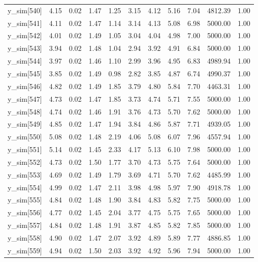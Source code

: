 \begin{table}[ht]
\begin{tabular}{rrrrrrrrrrr}
  y\_sim[540] & 4.15 & 0.02 & 1.47 & 1.25 & 3.15 & 4.12 & 5.16 & 7.04 & 4812.39 & 1.00 \\ 
  y\_sim[541] & 4.11 & 0.02 & 1.47 & 1.14 & 3.14 & 4.13 & 5.08 & 6.98 & 5000.00 & 1.00 \\ 
  y\_sim[542] & 4.01 & 0.02 & 1.49 & 1.05 & 3.04 & 4.04 & 4.98 & 7.00 & 5000.00 & 1.00 \\ 
  y\_sim[543] & 3.94 & 0.02 & 1.48 & 1.04 & 2.94 & 3.92 & 4.91 & 6.84 & 5000.00 & 1.00 \\ 
  y\_sim[544] & 3.97 & 0.02 & 1.46 & 1.10 & 2.99 & 3.96 & 4.95 & 6.83 & 4989.94 & 1.00 \\ 
  y\_sim[545] & 3.85 & 0.02 & 1.49 & 0.98 & 2.82 & 3.85 & 4.87 & 6.74 & 4990.37 & 1.00 \\ 
  y\_sim[546] & 4.82 & 0.02 & 1.49 & 1.85 & 3.79 & 4.80 & 5.84 & 7.70 & 4463.31 & 1.00 \\ 
  y\_sim[547] & 4.73 & 0.02 & 1.47 & 1.85 & 3.73 & 4.74 & 5.71 & 7.55 & 5000.00 & 1.00 \\ 
  y\_sim[548] & 4.74 & 0.02 & 1.46 & 1.91 & 3.76 & 4.73 & 5.70 & 7.62 & 5000.00 & 1.00 \\ 
  y\_sim[549] & 4.85 & 0.02 & 1.47 & 1.94 & 3.84 & 4.86 & 5.87 & 7.71 & 4939.05 & 1.00 \\ 
  y\_sim[550] & 5.08 & 0.02 & 1.48 & 2.19 & 4.06 & 5.08 & 6.07 & 7.96 & 4557.94 & 1.00 \\ 
  y\_sim[551] & 5.14 & 0.02 & 1.45 & 2.33 & 4.17 & 5.13 & 6.10 & 7.98 & 5000.00 & 1.00 \\ 
  y\_sim[552] & 4.73 & 0.02 & 1.50 & 1.77 & 3.70 & 4.73 & 5.75 & 7.64 & 5000.00 & 1.00 \\ 
  y\_sim[553] & 4.69 & 0.02 & 1.49 & 1.79 & 3.69 & 4.71 & 5.70 & 7.62 & 4485.99 & 1.00 \\ 
  y\_sim[554] & 4.99 & 0.02 & 1.47 & 2.11 & 3.98 & 4.98 & 5.97 & 7.90 & 4918.78 & 1.00 \\ 
  y\_sim[555] & 4.84 & 0.02 & 1.48 & 1.90 & 3.84 & 4.83 & 5.82 & 7.75 & 5000.00 & 1.00 \\ 
  y\_sim[556] & 4.77 & 0.02 & 1.45 & 2.04 & 3.77 & 4.75 & 5.75 & 7.65 & 5000.00 & 1.00 \\ 
  y\_sim[557] & 4.84 & 0.02 & 1.48 & 1.91 & 3.87 & 4.85 & 5.82 & 7.85 & 5000.00 & 1.00 \\ 
  y\_sim[558] & 4.90 & 0.02 & 1.47 & 2.07 & 3.92 & 4.89 & 5.89 & 7.77 & 4886.85 & 1.00 \\ 
  y\_sim[559] & 4.94 & 0.02 & 1.50 & 2.03 & 3.92 & 4.92 & 5.96 & 7.94 & 5000.00 & 1.00 \\ 

\end{tabular}
\end{table}
